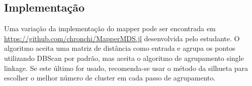 \subsection{Implementação} 

Uma variação da implementação do mapper pode ser encontrada em \url{https://github.com/chronchi/MapperMDS.jl}
desenvolvida pelo estudante. O algoritmo aceita uma matriz de distância como entrada e agrupa os pontos
utilizando DBScan \cite{Ester96} por padrão, mas aceita o algoritmo de agrupamento single linkage. 
Se este último for usado, recomenda-se usar o método da silhueta \cite{Rousseeuw1987} para escolher 
o melhor número de cluster em cada passo de agrupamento. 
